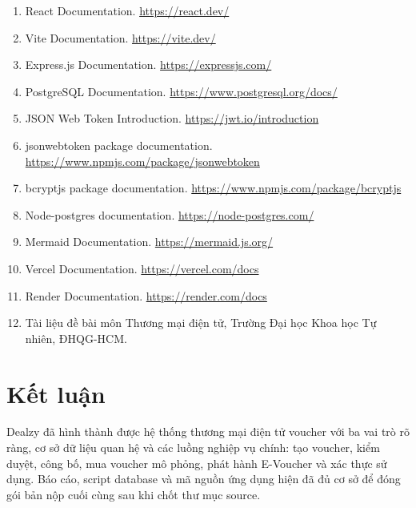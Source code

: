\begin{enumerate}[leftmargin=1.2cm]
    \item React Documentation. \url{https://react.dev/}
    \item Vite Documentation. \url{https://vite.dev/}
    \item Express.js Documentation. \url{https://expressjs.com/}
    \item PostgreSQL Documentation. \url{https://www.postgresql.org/docs/}
    \item JSON Web Token Introduction. \url{https://jwt.io/introduction}
    \item jsonwebtoken package documentation. \url{https://www.npmjs.com/package/jsonwebtoken}
    \item bcryptjs package documentation. \url{https://www.npmjs.com/package/bcryptjs}
    \item Node-postgres documentation. \url{https://node-postgres.com/}
    \item Mermaid Documentation. \url{https://mermaid.js.org/}
    \item Vercel Documentation. \url{https://vercel.com/docs}
    \item Render Documentation. \url{https://render.com/docs}
    \item Tài liệu đề bài môn Thương mại điện tử, Trường Đại học Khoa học Tự nhiên, ĐHQG-HCM.
\end{enumerate}

\section{Kết luận}

Dealzy đã hình thành được hệ thống thương mại điện tử voucher với ba vai trò rõ ràng, cơ sở dữ liệu quan hệ và các luồng nghiệp vụ chính: tạo voucher, kiểm duyệt, công bố, mua voucher mô phỏng, phát hành E-Voucher và xác thực sử dụng. Báo cáo, script database và mã nguồn ứng dụng hiện đã đủ cơ sở để đóng gói bản nộp cuối cùng sau khi chốt thư mục source.
